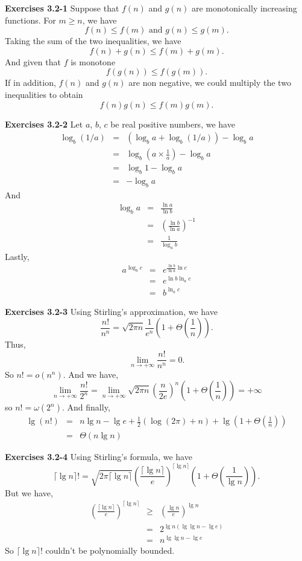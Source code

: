 \documentclass[a4paper,12pt]{article}
\newcommand{\newpar}[1]
{\bigskip \noindent \textbf{Exercises #1} \newline}
\begin{document}
\newpar{3.2-1}
Suppose that $f(n)$ and $g(n)$ are monotonically increasing
functions.  For $m \ge n$, we have
\[ f(n) \le f(m) \mbox{ and } g(n) \le g(m).\]
Taking the sum of the two inequalities, we have
\[ f(n) + g(n) \le f(m) + g(m).\]
And given that $f$ is monotone
\[ f(g(n)) \le f(g(m)).\]
If in addition, $f(n)$ and $g(n)$ are non negative, we could multiply
the two inequalities to obtain
\[ f(n) g(n)  \le f(m) g(m).\]

\newpar{3.2-2}
Let $a$, $b$, $c$ be real positive numbers, we have
\begin{eqnarray*}
\log_b(1/a) &=& (\log_ba + \log_b(1/a)) - \log_b a \\
&=& \log_b\left(a \times \frac{1}{a}\right) - \log_b a \\
&=& \log_b 1 - \log_b a \\
&=& -\log_b a
\end{eqnarray*}
And 
\begin{eqnarray*}
\log_ba &=& \frac{\ln a}{\ln b} \\
&=& \left(\frac{\ln b}{\ln a}\right)^{-1} \\
&=& \frac{1}{\log_a b}
\end{eqnarray*}
Lastly,
\begin{eqnarray*}
a^{\log_b c} &=& e^{\frac{\ln b}{\ln a} \ln c} \\
&=& e^{\ln b \ln_a c} \\
&=& b^{\ln_a c}
\end{eqnarray*}

\newpar{3.2-3}
Using Stirling's approximation, we have
\[ \frac{n!}{n^n} = \sqrt{2\pi n}\frac{1}{e^n}
\left(1 + \Theta\left(\frac{1}{n}\right)\right).\]
Thus,
\[ \lim_{n \to +\infty}\frac{n!}{n^n} = 0.\]
So $n! = o(n^n)$.  And we have,
\[ \lim_{n \to +\infty}\frac{n!}{2^n} =
\lim_{n \to +\infty}\sqrt{2\pi n}\left(\frac{n}{2e}\right)^n
\left(1 + \Theta\left(\frac{1}{n}\right)\right) = +\infty
\]
so $n! = \omega(2^n)$.  And finally,
\begin{eqnarray*}
\lg(n!) &=& n \lg n - \lg e + \frac{1}{2} (\log(2\pi) + n)
+ \lg\left(1 + \Theta\left(\frac{1}{n}\right)\right) \\
&=& \Theta(n \lg n)
\end{eqnarray*}

\newpar{3.2-4}
Using Stirling's formula, we have
 \[\lceil \lg n \rceil ! = \sqrt{2\pi \lceil \lg n \rceil}
\left(\frac{\lceil \lg n\rceil}{e}\right)^{\lceil \lg n\rceil}
\left(1 + \Theta\left(\frac{1}{\lg n}\right)\right).\]
But we have,
\begin{eqnarray*}
\left(\frac{\lceil \lg n\rceil}{e}\right)^{\lceil \lg n \rceil} &\ge&
\left(\frac{\lg n}{e}\right)^{\lg n} \\ &=&
2^{\lg n (\lg \lg n - \lg e)} \\ &=&
n^{\lg \lg n - \lg e}
\end{eqnarray*}
So $\lceil \lg n \rceil !$ couldn't be polynomially bounded.
\end{document}

